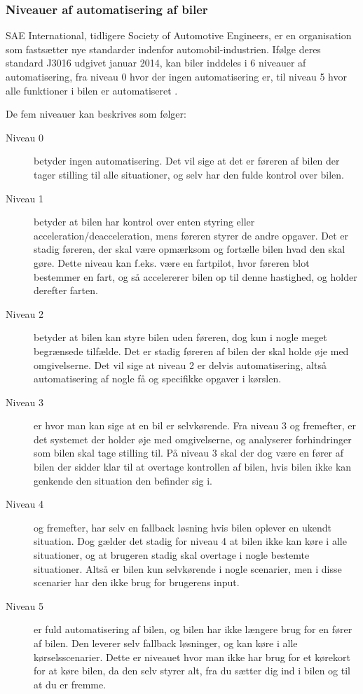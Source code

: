 \subsubsection{Niveauer af automatisering af biler}
SAE International, tidligere Society of Automotive Engineers, er en organisation som fastsætter nye standarder indenfor automobil-industrien. Ifølge deres standard J3016 udgivet januar 2014, kan biler inddeles i 6 niveauer af automatisering, fra niveau 0 hvor der ingen automatisering er, til niveau 5 hvor alle funktioner i bilen er automatiseret \cite{SAE_J3016}. 

De fem niveauer kan beskrives som følger:

\begin{description}
	\item[Niveau 0] betyder ingen automatisering. Det vil sige at det er føreren af bilen der tager stilling til alle situationer, og selv har den fulde kontrol over bilen.
	\item[Niveau 1] betyder at bilen har kontrol over enten styring eller acceleration/deacceleration, mens føreren styrer de andre opgaver. Det er stadig føreren, der skal være opmærksom og fortælle bilen hvad den skal gøre. Dette niveau kan f.eks. være en fartpilot, hvor føreren blot bestemmer en fart, og så accelererer bilen op til denne hastighed, og holder derefter farten. 
	\item[Niveau 2] betyder at bilen kan styre bilen uden føreren, dog kun i nogle meget begrænsede tilfælde. Det er stadig føreren af bilen der skal holde øje med omgivelserne. Det vil sige at niveau 2 er delvis automatisering, altså automatisering af nogle få og specifikke opgaver i kørslen.
	\item[Niveau 3] er hvor man kan sige at en bil er selvkørende. Fra niveau 3 og fremefter, er det systemet der holder øje med omgivelserne, og analyserer forhindringer som bilen skal tage stilling til. På niveau 3 skal der dog være en fører af bilen der sidder klar til at overtage kontrollen af bilen, hvis bilen ikke kan genkende den situation den befinder sig i.
	\item[Niveau 4] og fremefter, har selv en fallback løsning hvis bilen oplever en ukendt situation. Dog gælder det stadig for niveau 4 at bilen ikke kan køre i alle situationer, og at brugeren stadig skal overtage i nogle bestemte situationer. Altså er bilen kun selvkørende i nogle scenarier, men i disse scenarier har den ikke brug for brugerens input.
	\item[Niveau 5] er fuld automatisering af bilen, og bilen har ikke længere brug for en fører af bilen. Den leverer selv fallback løsninger, og kan køre i alle kørselsscenarier. Dette er niveauet hvor man ikke har brug for et kørekort for at køre bilen, da den selv styrer alt, fra du sætter dig ind i bilen og til at du er fremme.
\end{description}

